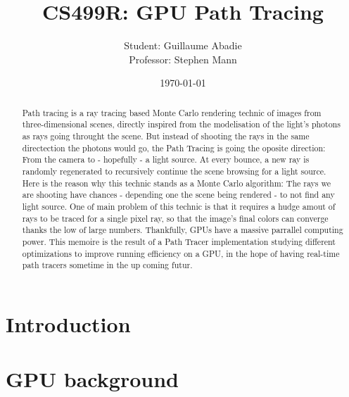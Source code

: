\documentclass[10pt,twocolumn,a4paper]{article}
\begin{document}
\title{CS499R: GPU Path Tracing}
\author{
    Student: Guillaume Abadie\\
    Professor: Stephen Mann
}
\date{\today}
\maketitle

\begin{abstract}

Path tracing is a ray tracing based Monte Carlo rendering technic of images from
three-dimensional scenes, directly inspired from the modelisation of the light's
photons as rays going throught the scene. But instead of shooting the rays in the
same directection the photons would go, the Path Tracing is going the oposite
direction: From the camera to - hopefully - a light source. At every bounce, a new
ray is randomly regenerated to recursively continue the scene browsing for a
light source. Here is the reason why this technic stands as a Monte Carlo
algorithm: The rays we are shooting have chances - depending one the scene
being rendered - to not find any light source. One of main problem of this
technic is that it requires a hudge
amout of rays to be traced for a single pixel ray, so that the image's final
colors can converge thanks the low of large numbers. Thankfully, GPUs have a
massive parrallel computing power. This memoire is the result
of a Path Tracer implementation studying different optimizations to
improve running efficiency on a GPU, in the hope of having real-time
path tracers sometime in the up coming futur.

\end{abstract}

\section{Introduction}


\section{GPU background}

\end{document}
